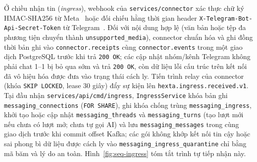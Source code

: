Ở chiều nhận tin (\emph{ingress}), webhook của \texttt{services/\hspace{0pt}connector} xác thực chữ ký HMAC-SHA256 từ Meta~\cite{meta-webhooks} hoặc đối chiếu hằng thời gian header \texttt{X-\hspace{0pt}Telegram-\hspace{0pt}Bot-\hspace{0pt}Api-\hspace{0pt}Secret-\hspace{0pt}Token} từ Telegram~\cite{telegram-bot-api}.
Đối với nội dung hợp lệ (văn bản hoặc tệp đa phương tiện chuyển thành \texttt{unsupported\_\hspace{0pt}media}), connector chuẩn hóa và ghi đồng thời bản ghi vào \texttt{connector.\hspace{0pt}receipts} cùng \texttt{connector.\hspace{0pt}events} trong một giao dịch PostgreSQL trước khi trả \texttt{200 OK}; các cập nhật nhóm/kênh Telegram không phải chat 1--1 bị bỏ qua sớm và trả \texttt{200 OK}, còn dữ liệu lỗi cấu trúc trên kết nối đã vô hiệu hóa được đưa vào trạng thái cách ly.
Tiến trình relay của connector (khóa \texttt{SKIP LOCKED}, lease 30 giây) đẩy sự kiện lên \texttt{hexta.\hspace{0pt}ingress.\hspace{0pt}received.\hspace{0pt}v1}.
Tại đầu nhận \texttt{services/\hspace{0pt}api/\hspace{0pt}cmd/\hspace{0pt}ingress}, \texttt{Ingress\hspace{0pt}Service} khóa bản ghi \texttt{messaging\_\hspace{0pt}connections} (\texttt{FOR SHARE}), ghi khóa chống trùng \texttt{messaging\_\hspace{0pt}ingress}, khởi tạo hoặc cập nhật \texttt{messaging\_\hspace{0pt}threads} và \texttt{messaging\_\hspace{0pt}turns} (tạo lượt mới nếu chưa có lượt mở; chưa tự gọi AI) và lưu \texttt{messaging\_\hspace{0pt}messages} trong cùng giao dịch trước khi commit offset Kafka; các gói không khớp kết nối tin cậy hoặc sai phong bì dữ liệu được cách ly vào \texttt{messaging\_\hspace{0pt}ingress\_\hspace{0pt}quarantine} chỉ bằng mã băm và lý do an toàn.
Hình~\ref{fig:seq-ingress} tóm tắt trình tự tiếp nhận này.

